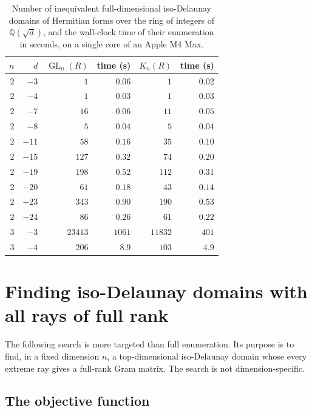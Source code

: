 \documentclass{amsart}
\newcommand{\GL}{\operatorname{GL}}
\newcommand{\QQ}{\mathbb{Q}}
\begin{document}
\begin{table}[ht]
\caption{Number of inequivalent full-dimensional iso-Delaunay domains of
Hermitian forms over the ring of integers of \(\QQ(\sqrt{d})\), and the
wall-clock time of their enumeration in seconds, on a single core of an
Apple M4 Max.}
\label{tab:tests}
\begin{tabular}{rrrrrr}
\(n\) & \(d\) & \(\GL_n(R)\) & time (s) & \(K_n(R)\) & time (s)\\
\hline
\(2\) & \(-3\) & \(1\) & \(0.06\) & \(1\) & \(0.02\)\\
\(2\) & \(-4\) & \(1\) & \(0.03\) & \(1\) & \(0.03\)\\
\(2\) & \(-7\) & \(16\) & \(0.06\) & \(11\) & \(0.05\)\\
\(2\) & \(-8\) & \(5\) & \(0.04\) & \(5\) & \(0.04\)\\
\(2\) & \(-11\) & \(58\) & \(0.16\) & \(35\) & \(0.10\)\\
\(2\) & \(-15\) & \(127\) & \(0.32\) & \(74\) & \(0.20\)\\
\(2\) & \(-19\) & \(198\) & \(0.52\) & \(112\) & \(0.31\)\\
\(2\) & \(-20\) & \(61\) & \(0.18\) & \(43\) & \(0.14\)\\
\(2\) & \(-23\) & \(343\) & \(0.90\) & \(190\) & \(0.53\)\\
\(2\) & \(-24\) & \(86\) & \(0.26\) & \(61\) & \(0.22\)\\
\(3\) & \(-3\) & \(23413\) & \(1061\) & \(11832\) & \(401\)\\
\(3\) & \(-4\) & \(206\) & \(8.9\) & \(103\) & \(4.9\)\\
\end{tabular}
\end{table}

\section{Finding iso-Delaunay domains with all rays of full rank}\label{sec:search}

The following search is more targeted than full enumeration.  Its purpose is to
find, in a fixed dimension \(n\), a top-dimensional iso-Delaunay domain whose
every extreme ray gives a full-rank Gram matrix.  The search is not
dimension-specific.

\subsection{The objective function}
\end{document}
